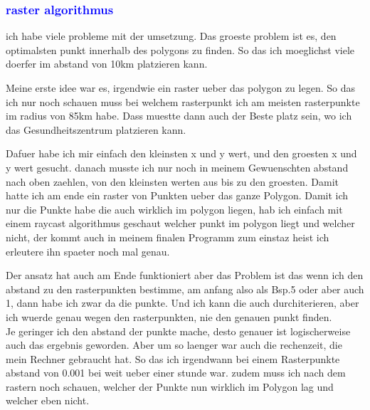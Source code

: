 \documentclass{article}
\begin{document}
\subsubsection{\textcolor{blue}{raster algorithmus}}
\begin{center}
ich habe viele probleme mit der umsetzung. Das groeste problem ist es, den optimalsten punkt innerhalb des polygons zu finden. So das ich moeglichst viele doerfer im abstand von 10km platzieren kann.
\par\medskip
 Meine erste idee war es, irgendwie ein raster ueber das polygon zu legen. So das ich nur noch schauen muss bei welchem rasterpunkt ich am meisten rasterpunkte im radius von 85km habe. Dass muestte dann auch der Beste platz sein, wo ich das Gesundheitszentrum platzieren kann.
\par\medskip
Dafuer habe ich mir einfach den kleinsten x und y wert, und den groesten x und y wert gesucht. danach musste ich nur noch in meinem Gewuenschten abstand nach oben zaehlen, von den kleinsten werten aus bis zu den groesten. Damit hatte ich am ende ein raster von Punkten ueber das ganze Polygon. Damit ich nur die Punkte habe die auch wirklich im polygon liegen, hab ich einfach mit einem raycast algorithmus geschaut welcher punkt im polygon liegt und welcher nicht, der kommt auch in meinem finalen Programm zum einstaz heist ich erleutere ihn spaeter noch mal genau.
\par\medskip
Der ansatz hat auch am Ende funktioniert aber das Problem ist das wenn ich den abstand zu den rasterpunkten bestimme, am anfang also als Bsp.5 oder aber auch 1, dann habe ich zwar da die punkte. Und ich kann die auch durchiterieren, aber ich wuerde genau wegen den rasterpunkten, nie den genauen punkt finden.
\\
 Je geringer ich den abstand der punkte mache, desto genauer ist logischerweise auch das ergebnis geworden. Aber um so laenger war auch die rechenzeit, die mein Rechner gebraucht hat. So das ich irgendwann bei einem Rasterpunkte abstand von 0.001 bei weit ueber einer stunde war. zudem muss ich nach dem rastern noch schauen, welcher der Punkte nun wirklich im Polygon lag und welcher eben nicht.
\par\medskip
\end{center}
\end{document}
